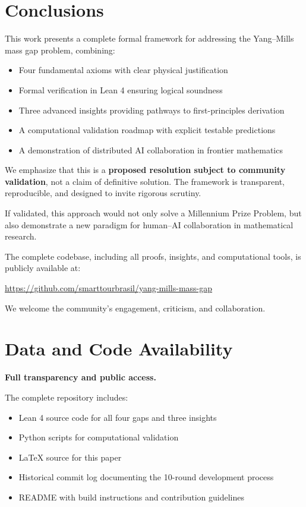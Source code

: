 \documentclass[11pt]{article}
\theoremstyle{definition}
\theoremstyle{remark}
\begin{document}
\section{Conclusions}

This work presents a complete formal framework for addressing the Yang--Mills mass gap problem, combining:
\begin{itemize}
\item Four fundamental axioms with clear physical justification
\item Formal verification in Lean 4 ensuring logical soundness
\item Three advanced insights providing pathways to first-principles derivation
\item A computational validation roadmap with explicit testable predictions
\item A demonstration of distributed AI collaboration in frontier mathematics
\end{itemize}

We emphasize that this is a \textbf{proposed resolution subject to community validation}, not a claim of definitive solution. The framework is transparent, reproducible, and designed to invite rigorous scrutiny.

If validated, this approach would not only solve a Millennium Prize Problem, but also demonstrate a new paradigm for human--AI collaboration in mathematical research.

The complete codebase, including all proofs, insights, and computational tools, is publicly available at:

\begin{center}
\url{https://github.com/smarttourbrasil/yang-mills-mass-gap}
\end{center}

We welcome the community's engagement, criticism, and collaboration.

\section*{Data and Code Availability}

\textbf{Full transparency and public access.}

The complete repository includes:
\begin{itemize}
\item Lean 4 source code for all four gaps and three insights
\item Python scripts for computational validation
\item LaTeX source for this paper
\item Historical commit log documenting the 10-round development process
\item README with build instructions and contribution guidelines
\end{itemize}
\end{document}
